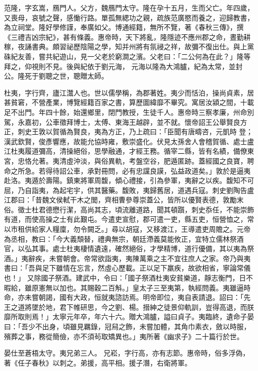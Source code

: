 \begin{pinyinscope}
 范隆，字玄嵩，鴈門人。父方，魏鴈門太守。隆在孕十五月，生而父亡。年四歲，又喪母，哀號之聲，感慟行路。單孤無緦功之親，疏族范廣愍而養之，迎歸教書，為立祠堂。隆好學修謹，奉廣如父。博通經籍，無所不覽，著《春秋三傳》，撰《三禮吉凶宗紀》，甚有條義。惠帝時，天下將亂，隆隱迹不應州郡之命，晝勤耕稼，夜誦書典。頗習祕歷陰陽之學，知并州將有氛祲之祥，故彌不復出仕。與上黨硃紀友善，嘗共紀遊山，見一父老於窮澗之濱。父老曰：「二公何為在此？」隆等拜之，仰視則不見。後與紀依于劉元海，
 元海以隆為大鴻臚，紀為太常，並封公。隆死于劉聰之世，聰贈太師。



 杜夷，字行齊，廬江灊人也。世以儒學稱，為郡著姓。夷少而恬泊，操尚貞素，居甚貧窘，不營產業，博覽經籍百家之書，算歷圖緯靡不畢究。寓居汝潁之間，十載足不出門。年四十餘，始還鄉里，閉門教授，生徒千人。惠帝時三察孝廉，州命別駕，永嘉初，公車徵拜博士，太傅、東海王越辟，並不就。懷帝詔王公舉賢良方正，刺史王敦以賀循為賢良，夷為方正，乃上疏曰：「臣聞有唐疇咨，元凱時
 登；漢武欽賢，俊彥響應，故能允協時雍，敷崇盛化。伏見太孫舍人會稽賀循、處士盧江杜夷履道彌高，清操絕俗，思學融通，才經王務。循宰二縣，皆有名績，備僚東宮，忠恪允著。夷清虛沖淡，與俗異軌，考盤空谷，肥遁匿跡。蓋經國之良寶，聘命之所急。若得待詔公車，承對冊問，必有忠讜良謨，弘益政道矣。」敦於是逼夷赴洛。夷遁於壽陽。鎮東將軍周馥，傾心禮接，引為參軍，夷辭之以疾。馥知不可屈，乃自詣夷，為起宅宇，供其醫藥。馥敗，夷歸舊居，道遇兵寇。刺史劉陶告盧江郡曰：「昔魏文侯軾干木之閭，齊相曹參尊崇蓋公，皆所以優賢表德，敦勵末
 俗。徵士杜君德懋行潔，高尚其志，頃流離道路，聞其頓躓，刺史忝任，不能崇飾有道，而使高操之士有此艱屯。今遣吏宣慰，郡可遣一吏，縣五吏，恒營恤之，常以市租供給家人糧廩，勿令闕乏。」尋以胡寇，又移渡江，王導遣吏周贍之。元帝為丞相，教曰：「今大義頹替，禮典無宗，朝廷滯義莫能攸正，宜特立儒林祭酒官，以弘其事。處士杜夷棲情遺遠，確然絕俗，才學精博，道行優備，其以夷為祭酒。」夷辭疾，未嘗朝會。帝常欲詣夷，夷陳萬乘之主不宜往庶人之家。帝乃與夷書曰：「吾與足下雖情在忘言，然虛心歷載。正以足下羸疾，故欲相省，寧論常儀也！」
 又除國子祭酒。建武中，令曰：「國子祭酒杜夷安貧樂道，靜志衡門，日不暇給，雖原憲無以加也。其賜穀二百斛。」皇太子三至夷第，執經問義。夷雖逼時命，亦未嘗朝謁，國有大政，恒就夷諮訪焉。明帝即位，夷自表請退。詔曰：「先王之道將墜於地，君下帷研思，今之劉、楊。搢紳之徒景仰軌訓，豈得高退，而朕靡所取則焉！」太寧元年卒，年六十六。贈大鴻臚，謚曰貞子。夷臨終，遺命子晏曰：「吾少不出身，頃雖見羈錄，冠舄之飾，未嘗加體，其角巾素衣，斂以時服，殯葬之事，務從簡儉，亦不須茍取矯異也。」夷所著《幽求子》二十篇行於世。



 晏仕至蒼梧太守。夷兄弟三人。
 兄崧，字行高，亦有志節。惠帝時，俗多浮偽，著《任子春秋》以刺之。弟援，高平相。援子潛，右衛將軍。




\end{pinyinscope}
